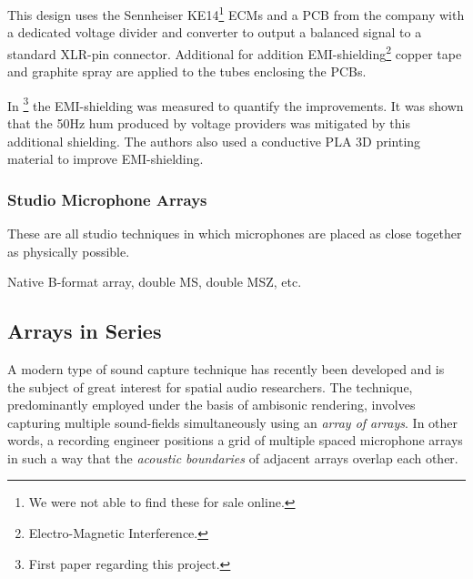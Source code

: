 This design uses the Sennheiser KE14\footnote{We were not able to find these for sale online.} ECMs and a PCB from the company with a dedicated voltage divider and converter to output a balanced signal to a standard XLR-pin connector. Additional for addition EMI-shielding\footnote{Electro-Magnetic Interference.} copper tape and graphite spray are applied to the tubes enclosing the PCBs. 

In \cite{dziwis2019development}\footnote{First paper regarding this project.} the EMI-shielding was measured to quantify the improvements. It was shown that the 50Hz hum produced by voltage providers was mitigated by this additional shielding. The authors also used a conductive PLA 3D printing material to improve EMI-shielding. 




\begin{quote}
    
\end{quote}



\subsubsection{Studio Microphone Arrays}

These are all studio techniques in which microphones are placed as close together as physically possible. 

Native B-format array, double MS, double MSZ, etc.

\subsection{Arrays in Series}

A modern type of sound capture technique has recently been developed and is the subject of great interest for spatial audio researchers. The technique, predominantly employed under the basis of ambisonic rendering, involves capturing multiple sound-fields simultaneously using an \textit{array of arrays}. In other words, a recording engineer positions a grid of multiple spaced microphone arrays in such a way that the \textit{acoustic boundaries} of adjacent arrays overlap each other. 

